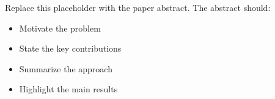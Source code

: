 
Replace this placeholder with the paper abstract. The abstract should:
\begin{itemize}
  \item Motivate the problem
  \item State the key contributions
  \item Summarize the approach
  \item Highlight the main results
\end{itemize}
